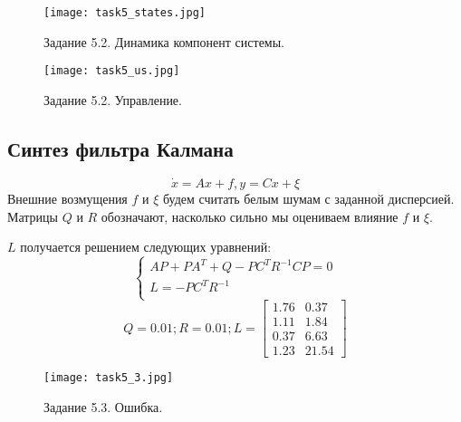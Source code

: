 \begin{figure}[]
        \centering
        \texttt{[image: task5\_states.jpg]}
        \caption{Задание 5.2. Динамика компонент системы.}
        \label{fig:task5_states}
\end{figure}

\begin{figure}[]
        \centering
        \texttt{[image: task5\_us.jpg]}
        \caption{Задание 5.2. Управление.}
        \label{fig:task5_u}
\end{figure}


\subsection{Синтез фильтра Калмана}
\begin{equation}
    \dot{x} = Ax + f, y = Cx + \xi
\end{equation}
Внешние возмущения $f$ и $\xi$  будем считать белым шумам с заданной дисперсией.
Матрицы \(Q\) и \(R\) обозначают, насколько сильно мы оцениваем влияние \(f\) и \(\xi\).

\(L\) получается решением следующих уравнений:
\[
\begin{cases}
    A P + P A^T + Q - PC^TR^{-1}CP = 0\\
    L = -P C^T R^{-1}\\
\end{cases}
\]
\[Q = 0.01; R = 0.01; L = \begin{bmatrix}
    1.76 &  0.37\\
    1.11 &  1.84\\
    0.37 &  6.63\\
    1.23 &  21.54
  \end{bmatrix}\]
\begin{figure}[]
        \centering
        \texttt{[image: task5\_3.jpg]}
        \caption{Задание 5.3. Ошибка.}
        \label{fig:task5_3}
\end{figure}


